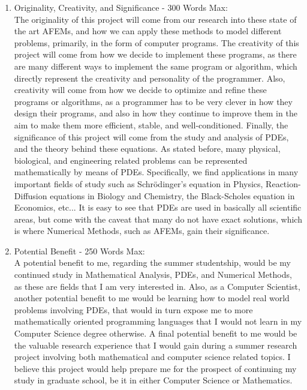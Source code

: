 \documentclass[11pt]{article}
\begin{document}
\begin{enumerate}
\item Originality, Creativity, and Significance - 300 Words Max: \\
The originality of this project will come from our research into these state of the art AFEMs, and how we can apply these methods to model different problems,
primarily, in the form of computer programs. The creativity of this project will come from how we decide to implement these programs, as there
are many different ways to implement the same program or algorithm, which directly represent the creativity and personality of the programmer.
Also, creativity will come from how we decide to optimize and refine these programs or algorithms, as a programmer has to be very clever in how they
design their programs, and also in how they continue to improve them in the aim to make them more efficient, stable, and well-conditioned.
Finally, the significance of this project will come from the study and analysis of PDEs, and the theory behind these equations. As stated before, many physical, biological, and engineering related
problems can be represented mathematically by means of PDEs. Specifically, we find applications in many important fields of study such as Schrödinger's equation in Physics,
Reaction-Diffusion equations in Biology and Chemistry, the Black-Scholes equation in Economics, etc... It is easy to see that PDEs are used in basically all scientific areas,
but come with the caveat that many do not have exact solutions, which is where Numerical Methods, such as AFEMs, gain their significance.

\newpage

\item Potential Benefit - 250 Words Max: \\
A potential benefit to me, regarding the summer studentship, would be my continued study in Mathematical Analysis, PDEs, and Numerical Methods,
as these are fields that I am very interested in. Also, as a Computer Scientist, another potential benefit to me would be learning how to model real world 
problems involving PDEs, that would in turn
expose me to more mathematically oriented programming languages that I would not learn in my Computer Science degree otherwise.
A final potential benefit to me would be the valuable research experience that I would gain during a summer research project involving both mathematical
and computer science related topics. I believe this project would
help prepare me for the prospect of continuing my study in graduate school, be it in either Computer Science or Mathematics.


\end{enumerate}
\end{document}
